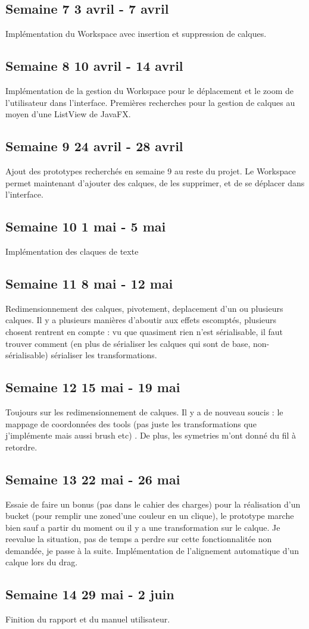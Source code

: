 \subsection{Semaine 7 3 avril - 7 avril}
Implémentation du Workspace avec insertion et suppression de calques.
\subsection{Semaine 8 10 avril - 14 avril}
Implémentation de la gestion du Workspace pour le déplacement et le zoom de l'utilisateur dans l'interface. Premières recherches pour la gestion de calques au moyen d'une ListView de JavaFX.
\subsection{Semaine 9 24 avril - 28 avril}
Ajout des prototypes recherchés en semaine 9 au reste du projet. Le Workspace permet maintenant d'ajouter des calques, de les supprimer, et de se déplacer dans l'interface. 
\subsection{Semaine 10 1 mai - 5 mai}
Implémentation des claques de texte
\subsection{Semaine 11 8 mai - 12 mai} 
Redimensionnement des calques, pivotement, deplacement d'un ou plusieurs calques. Il y a plusieurs manières d'aboutir aux effets escomptés, plusieurs chosent rentrent en compte : vu que quasiment rien n'est sérialisable, il faut trouver comment (en plus de sérialiser les calques qui sont de base, non-sérialisable) sérialiser les transformations.
\subsection{Semaine 12 15 mai - 19 mai}
Toujours sur les redimensionnement de calques. Il y a de nouveau soucis : le mappage de coordonnées des tools (pas juste les transformations que j'implémente mais aussi brush etc) . De plus, les symetries m'ont donné du fil à retordre.
\subsection{Semaine 13 22 mai - 26 mai}
Essaie de faire un bonus (pas dans le cahier des charges) pour la réalisation d'un bucket (pour remplir une zoned'une couleur en un clique), le prototype marche bien sauf a partir du moment ou il y a une transformation sur le calque. Je reevalue la situation, pas de temps a perdre sur cette fonctionnalitée non demandée, je passe à la suite. Implémentation de l'alignement automatique d'un calque lors du drag.
\subsection{Semaine 14 29 mai - 2 juin}
Finition du rapport et du manuel utilisateur.



